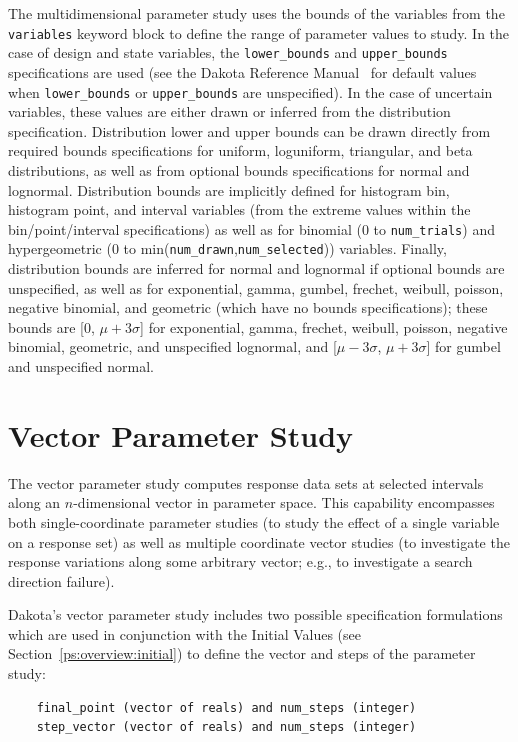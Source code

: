 The multidimensional parameter study uses the bounds of the variables
from the \texttt{variables} keyword block to define the range of
parameter values to study. In the case of design and state variables,
the \texttt{lower\_bounds} and \texttt{upper\_bounds} specifications
are used (see the Dakota Reference Manual~\cite{RefMan} for default
values when \texttt{lower\_bounds} or \texttt{upper\_bounds} are
unspecified). In the case of uncertain variables, these values are
either drawn or inferred from the distribution specification.
Distribution lower and upper bounds can be drawn directly from
required bounds specifications for uniform, loguniform, triangular,
and beta distributions, as well as from optional bounds specifications
for normal and lognormal.  Distribution bounds are implicitly defined
for histogram bin, histogram point, and interval variables (from the
extreme values within the bin/point/interval specifications) as well
as for binomial (0 to \texttt{num\_trials}) and hypergeometric (0 to
min(\texttt{num\_drawn},\texttt{num\_selected})) variables.  Finally,
distribution bounds are inferred for normal and lognormal if optional
bounds are unspecified, as well as for exponential, gamma, gumbel,
frechet, weibull, poisson, negative binomial, and geometric (which
have no bounds specifications); these bounds are [0, $\mu + 3 \sigma$]
for exponential, gamma, frechet, weibull, poisson, negative binomial,
geometric, and unspecified lognormal, and [$\mu - 3\sigma$, 
$\mu + 3\sigma$] for gumbel and unspecified normal.


\section{Vector Parameter Study}\label{ps:vector}

The vector parameter study computes response data sets at selected
intervals along an $n$-dimensional vector in parameter space. This
capability encompasses both single-coordinate parameter studies (to
study the effect of a single variable on a response set) as well as
multiple coordinate vector studies (to investigate the response
variations along some arbitrary vector; e.g., to investigate a
search direction failure).

Dakota's vector parameter study includes two possible specification
formulations which are used in conjunction with the Initial Values
(see Section~\ref{ps:overview:initial}) to define the vector and steps
of the parameter study:
\begin{small}
\begin{verbatim}
    final_point (vector of reals) and num_steps (integer)
    step_vector (vector of reals) and num_steps (integer)
\end{verbatim}
\end{small}

